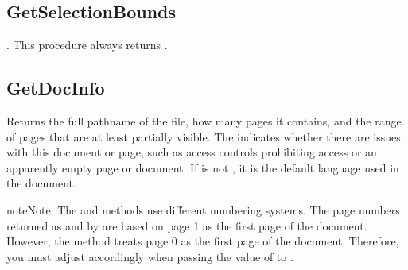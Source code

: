 \documentclass[letterpaper,12pt,english,openany,oneside]{sphinxmanual}
\begin{document}
\subsection{GetSelectionBounds}
\label{\detokenize{Access_DOM:getselectionbounds}}
 . This procedure always returns  .

\begin{sphinxVerbatim}[commandchars=\\\{\}]
 
 
 
 
 
\end{sphinxVerbatim}


\subsection{GetDocInfo}
\label{\detokenize{Access_DOM:getdocinfo}}
Returns the full pathname of the file, how many pages it contains, and the range of pages that are at least partially visible. The  indicates whether there are issues with this document or page, such as access controls prohibiting access or an apparently empty page or document. If  is not  , it is the default language used in the document.

\begin{sphinxadmonition}{note}{Note:}
The  and  methods use different numbering systems. The page numbers returned as  and  by  are based on page 1 as the first page of the document. However, the  method treats page 0 as the first page of the document. Therefore, you must adjust accordingly when passing the value of  to  .
\end{sphinxadmonition}

\begin{sphinxVerbatim}[commandchars=\\\{\}]
 
 
 
 
 
 
 
\end{sphinxVerbatim}
\end{document}
